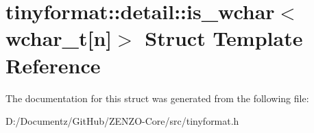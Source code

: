 \hypertarget{structtinyformat_1_1detail_1_1is__wchar_3_01wchar__t[n]_4}{}\section{tinyformat\+::detail\+::is\+\_\+wchar$<$ wchar\+\_\+t\mbox{[}n\mbox{]}$>$ Struct Template Reference}
\label{structtinyformat_1_1detail_1_1is__wchar_3_01wchar__t[n]_4}


The documentation for this struct was generated from the following file\+:\begin{DoxyCompactItemize}
\item 
D\+:/\+Documentz/\+Git\+Hub/\+Z\+E\+N\+Z\+O-\/\+Core/src/tinyformat.\+h\end{DoxyCompactItemize}
